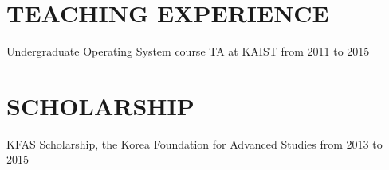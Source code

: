 \section{TEACHING EXPERIENCE}
    Undergraduate Operating System course TA at KAIST from 2011 to 2015

\section{SCHOLARSHIP}
   KFAS Scholarship, the Korea Foundation for Advanced Studies from 2013 to 2015
